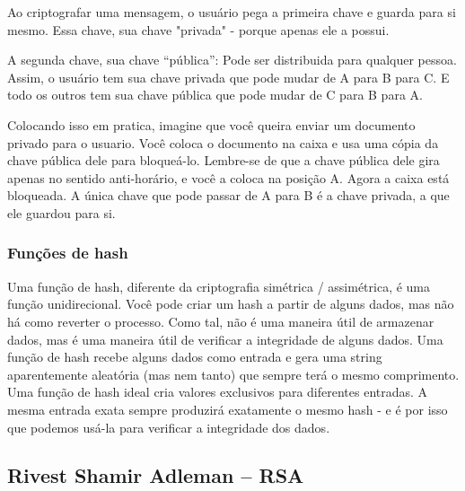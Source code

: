 Ao criptografar uma mensagem, o usuário pega a primeira chave e guarda para si mesmo. Essa chave, sua chave "privada" - porque apenas ele a possui.

A segunda chave, sua chave “pública”: Pode ser distribuida para qualquer pessoa. Assim, o usuário tem sua chave privada que pode mudar de A para B para C. E todo os outros tem sua chave pública que pode mudar de C para B para A.

Colocando isso em pratica, imagine que você queira enviar um documento privado para o usuario. Você coloca o documento na caixa e usa uma cópia da chave pública dele para bloqueá-lo. Lembre-se de que a chave pública dele gira apenas no sentido anti-horário, e você a coloca na posição A. Agora a caixa está bloqueada. A única chave que pode passar de A para B é a chave privada, a que ele guardou para si.

\subsubsection{Funções de hash}
Uma função de hash, diferente da criptografia simétrica / assimétrica, é uma função unidirecional. Você pode criar um hash a partir de alguns dados, mas não há como reverter o processo. Como tal, não é uma maneira útil de armazenar dados, mas é uma maneira útil de verificar a integridade de alguns dados.
Uma função de hash recebe alguns dados como entrada e gera uma string aparentemente aleatória (mas nem tanto) que sempre terá o mesmo comprimento. Uma função de hash ideal cria valores exclusivos para diferentes entradas. A mesma entrada exata sempre produzirá exatamente o mesmo hash - e é por isso que podemos usá-la para verificar a integridade dos dados.

\subsection{Rivest Shamir Adleman – RSA}

